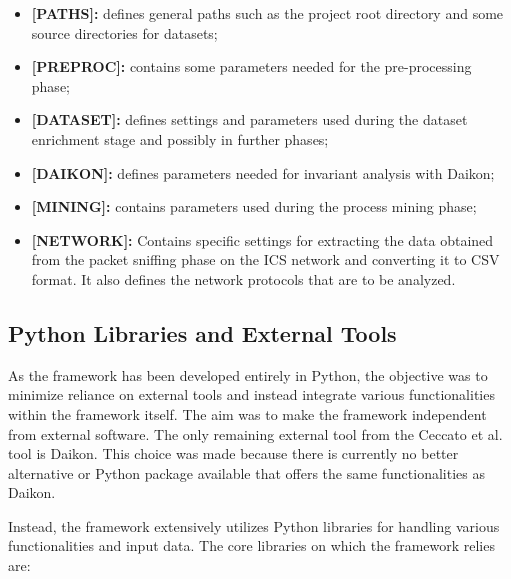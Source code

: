 \begin{itemize}
	\item \textbf{[PATHS]:} defines general paths such as the project root directory and some source directories for datasets;
	
	\item \textbf{[PREPROC]:} contains some parameters needed for the pre-processing phase;
	
	\item \textbf{[DATASET]:} defines settings and parameters used during the dataset enrichment stage and possibly in further phases;
	
	\item \textbf{[DAIKON]:} defines parameters needed for invariant analysis with Daikon;
	
	\item \textbf{[MINING]:} contains parameters used during the process mining phase;
	
	\item \textbf{[NETWORK]:} Contains specific settings for extracting the data obtained from the packet sniffing phase on the ICS network and converting it to CSV format. It also defines the network protocols that are to be analyzed.
\end{itemize}

\subsection{Python Libraries and External Tools}
\label{subsec:4_tools_libraries}
As the framework has been developed entirely in Python, the objective was to minimize reliance on external tools and instead integrate various functionalities within the framework itself. The aim was to make the framework independent from external software. The only remaining external tool from the Ceccato et al. tool is Daikon. This choice was made because there is currently no better alternative or Python package available that offers the same functionalities as Daikon.

\bigskip
Instead, the framework extensively utilizes Python libraries for handling various functionalities and input data. The core libraries on which the framework relies are:

